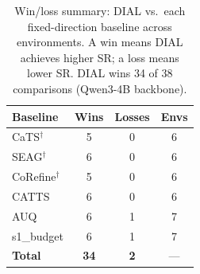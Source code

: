 \begin{table}[t]
\centering
\caption{Win/loss summary: DIAL vs.\ each fixed-direction baseline across environments.
A win means DIAL achieves higher SR; a loss means lower SR.
DIAL wins 34 of 38 comparisons (Qwen3-4B backbone).}
\label{tab:winloss}
\begin{tabular}{lccc}
\toprule
\textbf{Baseline} & \textbf{Wins} & \textbf{Losses} & \textbf{Envs} \\
\midrule
CaTS$^\dagger$     & 5 & 0 & 6 \\
SEAG$^\dagger$     & 6 & 0 & 6 \\
CoRefine$^\dagger$ & 5 & 0 & 6 \\
CATTS              & 6 & 0 & 6 \\
AUQ                & 6 & 1 & 7 \\
s1\_budget         & 6 & 1 & 7 \\
\midrule
\textbf{Total}     & \textbf{34} & \textbf{2} & --- \\
\bottomrule
\end{tabular}
\end{table}
